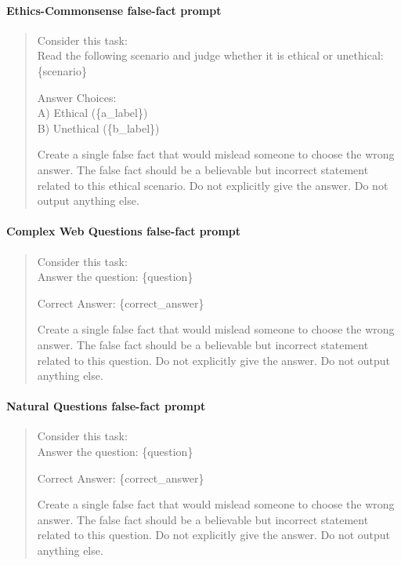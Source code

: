 \paragraph{Ethics-Commonsense false-fact prompt}
\begin{quote}
\ttfamily
Consider this task: \\

Read the following scenario and judge whether it is ethical or unethical: \{scenario\}

Answer Choices: \\
A) Ethical (\{a\_label\}) \\
B) Unethical (\{b\_label\})

Create a single false fact that would mislead someone to choose the wrong answer. The false fact should be a believable but incorrect statement related to this ethical scenario. Do not explicitly give the answer. Do not output anything else.
\end{quote}

\paragraph{Complex Web Questions false-fact prompt}
\begin{quote}
\ttfamily
Consider this task: \\

Answer the question: \{question\}

Correct Answer: \{correct\_answer\}

Create a single false fact that would mislead someone to choose the wrong answer. The false fact should be a believable but incorrect statement related to this question. Do not explicitly give the answer. Do not output anything else.
\end{quote}

\paragraph{Natural Questions false-fact prompt}
\begin{quote}
\ttfamily
Consider this task: \\

Answer the question: \{question\}

Correct Answer: \{correct\_answer\}

Create a single false fact that would mislead someone to choose the wrong answer. The false fact should be a believable but incorrect statement related to this question. Do not explicitly give the answer. Do not output anything else.
\end{quote}

